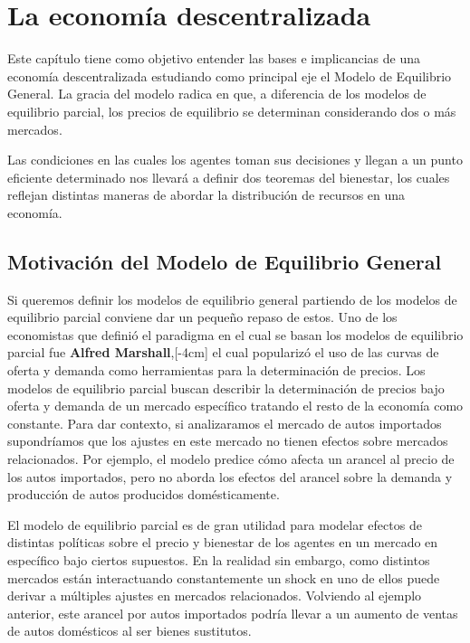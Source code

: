 \section{La economía descentralizada}

Este capítulo tiene como objetivo entender las bases e implicancias de una economía descentralizada estudiando como principal eje el Modelo de Equilibrio General. La gracia del modelo radica en que, a diferencia de los modelos de equilibrio parcial, los precios de equilibrio se determinan considerando dos o más mercados.

Las condiciones en las cuales los agentes toman sus decisiones y llegan a un punto eficiente determinado nos llevará a definir dos teoremas del bienestar, los cuales reflejan distintas maneras de abordar la distribución de recursos en una economía.

\subsection{Motivación del Modelo de Equilibrio General}

Si queremos definir los modelos de equilibrio general partiendo de los modelos de equilibrio parcial conviene dar un pequeño repaso de estos. Uno de los economistas que definió el paradigma en el cual se basan los modelos de equilibrio parcial fue \textbf{Alfred Marshall},[-4cm] el cual popularizó el uso de las curvas de oferta y demanda como herramientas para la determinación de precios. Los modelos de equilibrio parcial buscan describir la determinación de precios bajo oferta y demanda de un mercado específico tratando el resto de la economía como constante. Para dar contexto, si analizaramos el mercado de autos importados supondríamos que los ajustes en este mercado no tienen efectos sobre mercados relacionados. Por ejemplo, el modelo predice cómo afecta un arancel al precio de los autos importados, pero no aborda los efectos del arancel sobre la demanda y producción de autos producidos domésticamente.

El modelo de equilibrio parcial es de gran utilidad para modelar efectos de distintas políticas sobre el precio y bienestar de los agentes en un mercado en específico bajo ciertos supuestos. En la realidad sin embargo, como distintos mercados están interactuando constantemente un shock en uno de ellos puede derivar a múltiples ajustes en mercados relacionados. Volviendo al ejemplo anterior, este arancel por autos importados podría llevar a un aumento de ventas de autos domésticos al ser bienes sustitutos. 

